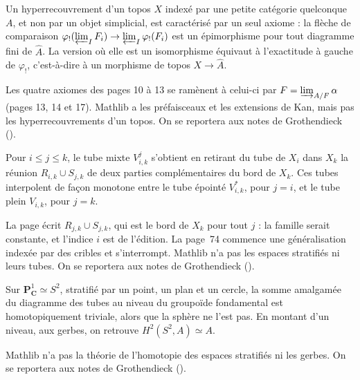 \begin{encadre}
\begin{theoreme*}\nonverifie
Un hyperrecouvrement d'un topos $X$ indexé par une petite catégorie quelconque $A$, et non par un objet simplicial, est caractérisé par un seul axiome : la flèche de comparaison $\varphi_!(\varprojlim_I F_i) \to \varprojlim_I \varphi_!(F_i)$ est un épimorphisme pour tout diagramme fini de $\hat A$. La version où elle est un isomorphisme équivaut à l'exactitude à gauche de $\varphi_!$, c'est-à-dire à un morphisme de topos $X \to \hat A$.
\end{theoreme*}
\end{encadre}
{\small Les quatre axiomes des pages 10 à 13 se ramènent à celui-ci par $F = \varinjlim_{A/F} \alpha$ (pages 13, 14 et 17). Mathlib a les préfaisceaux et les extensions de Kan, mais pas les hyperrecouvrements d'un topos. On se reportera aux notes de Grothendieck ().\par}

\begin{encadre}
\begin{definition*}
Pour $i \leq j \leq k$, le tube mixte $V^j_{i,k}$ s'obtient en retirant du tube de $X_i$ dans $X_k$ la réunion $R_{i,k} \cup S_{j,k}$ de deux parties complémentaires du bord de $X_k$. Ces tubes interpolent de façon monotone entre le tube épointé $V^*_{i,k}$, pour $j = i$, et le tube plein $V_{i,k}$, pour $j = k$.
\end{definition*}
\end{encadre}
{\small La page écrit $R_{j,k} \cup S_{j,k}$, qui est le bord de $X_k$ pour tout $j$ : la famille serait constante, et l'indice $i$ est de l'édition. La page~74 commence une généralisation indexée par des cribles et s'interrompt. Mathlib n'a pas les espaces stratifiés ni leurs tubes. On se reportera aux notes de Grothendieck ().\par}

\begin{encadre}
\begin{exemple*}\nonverifie
Sur $\mathbf P^1_{\mathbf C} \simeq S^2$, stratifié par un point, un plan et un cercle, la somme amalgamée du diagramme des tubes au niveau du groupoïde fondamental est homotopiquement triviale, alors que la sphère ne l'est pas. En montant d'un niveau, aux gerbes, on retrouve $H^2(S^2, A) \simeq A$.
\end{exemple*}
\end{encadre}
{\small Mathlib n'a pas la théorie de l'homotopie des espaces stratifiés ni les gerbes. On se reportera aux notes de Grothendieck ().\par}

